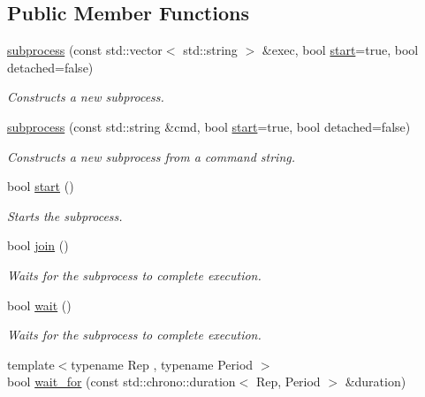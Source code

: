 \subsection*{Public Member Functions}
\begin{DoxyCompactItemize}
\item 
\hyperlink{classcpen333_1_1process_1_1posix_1_1subprocess_a427822d8d77afa1014a0d10a5f50aa14}{subprocess} (const std\+::vector$<$ std\+::string $>$ \&exec, bool \hyperlink{classcpen333_1_1process_1_1posix_1_1subprocess_a8738add1094b2dda57b9ffb8ec6828c1}{start}=true, bool detached=false)
\begin{DoxyCompactList}\small\item\em Constructs a new subprocess. \end{DoxyCompactList}\item 
\hyperlink{classcpen333_1_1process_1_1posix_1_1subprocess_a5c0d64e12281789fa5ce25f03fa17bd9}{subprocess} (const std\+::string \&cmd, bool \hyperlink{classcpen333_1_1process_1_1posix_1_1subprocess_a8738add1094b2dda57b9ffb8ec6828c1}{start}=true, bool detached=false)
\begin{DoxyCompactList}\small\item\em Constructs a new subprocess from a command string. \end{DoxyCompactList}\item 
bool \hyperlink{classcpen333_1_1process_1_1posix_1_1subprocess_a8738add1094b2dda57b9ffb8ec6828c1}{start} ()
\begin{DoxyCompactList}\small\item\em Starts the subprocess. \end{DoxyCompactList}\item 
bool \hyperlink{classcpen333_1_1process_1_1posix_1_1subprocess_af711962e3b6649476bd8cbbd6c59ea8b}{join} ()
\begin{DoxyCompactList}\small\item\em Waits for the subprocess to complete execution. \end{DoxyCompactList}\item 
bool \hyperlink{classcpen333_1_1process_1_1posix_1_1subprocess_a8928b9937577c0ec288318b2176156a0}{wait} ()
\begin{DoxyCompactList}\small\item\em Waits for the subprocess to complete execution. \end{DoxyCompactList}\item 
{\footnotesize template$<$typename Rep , typename Period $>$ }\\bool \hyperlink{classcpen333_1_1process_1_1posix_1_1subprocess_a1543488d24eaf0f819e81f31d9d388cb}{wait\+\_\+for} (const std\+::chrono\+::duration$<$ Rep, Period $>$ \&duration)

\end{DoxyCompactItemize}

